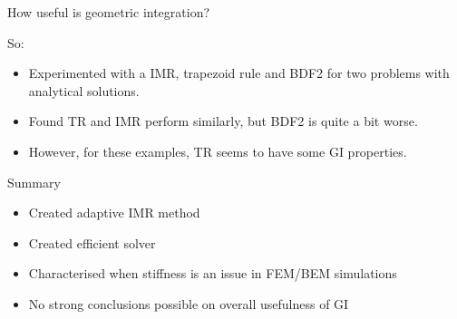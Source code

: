 \documentclass[18pt]{beamer}
\newlength{\wideitemsep}
\let\olditem\item
\renewcommand{\item}{\setlength{\itemsep}{\wideitemsep}\olditem}
\begin{document}
\begin{frame}{How useful is geometric integration?}

  So:
  \begin{itemize}
  \item Experimented with a IMR, trapezoid rule and BDF2 for two problems with
    analytical solutions.
  \item Found TR and IMR perform similarly, but BDF2 is quite a bit worse.
  \item However, for these examples, TR seems to have some GI properties.
  \end{itemize}

\end{frame}



\begin{frame}{Summary}
  \begin{itemize}
  \item Created adaptive IMR method
  \item Created efficient solver
  \item Characterised when stiffness is an issue in FEM/BEM simulations
  \item No strong conclusions possible on overall usefulness of GI
  \end{itemize}
\end{frame}
\end{document}
